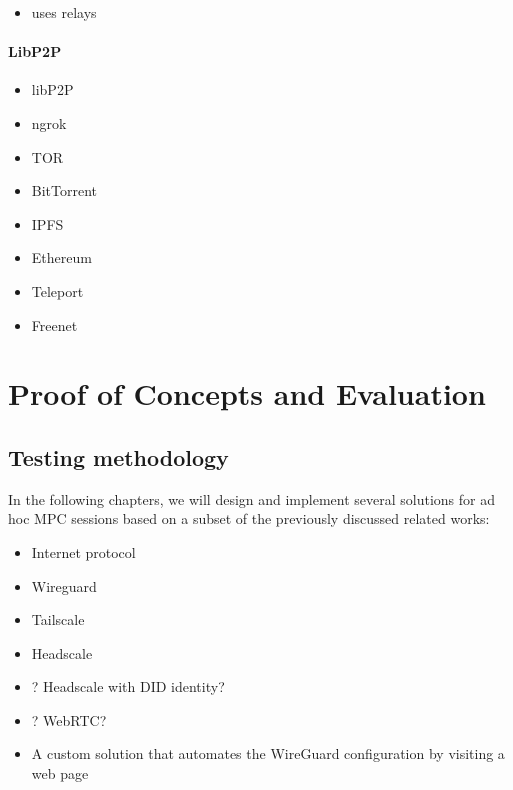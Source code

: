 
\begin{itemize}
\tightlist
\item
  uses relays
\end{itemize}

\hypertarget{libp2p}{%
\subsection{LibP2P}\label{libp2p}}

\begin{itemize}
\tightlist
\item
  libP2P
\item
  ngrok
\item
  TOR
\item
  BitTorrent
\item
  IPFS
\item
  Ethereum
\item
  Teleport
\item
  Freenet
\end{itemize}

\hypertarget{proof-of-concepts-and-evaluation}{%
\part{Proof of Concepts and
Evaluation}\label{proof-of-concepts-and-evaluation}}

\hypertarget{testing-methodology}{%
\chapter{Testing methodology}\label{testing-methodology}}

In the following chapters, we will design and implement several
solutions for ad hoc MPC sessions based on a subset of the previously
discussed related works:

\begin{itemize}
\tightlist
\item
  Internet protocol
\item
  Wireguard
\item
  Tailscale
\item
  Headscale
\item
  ? Headscale with DID identity?
\item
  ? WebRTC?
\item
  A custom solution that automates the WireGuard configuration by
  visiting a web page
\end{itemize}

